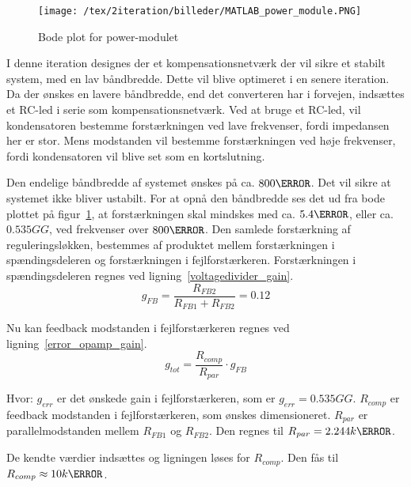 \begin{figure}[H]
	\center
	\texttt{[image: /tex/2iteration/billeder/MATLAB\_power\_module.PNG]}
	\caption{Bode plot for power-modulet}
	\label{fig:MATLAB_power_module}
\end{figure}

I denne iteration designes der et kompensationsnetværk der vil sikre et stabilt system, med en lav båndbredde. Dette vil blive optimeret i en senere iteration. 
Da der ønskes en lavere båndbredde, end det converteren har i forvejen, indsættes et RC-led i serie som kompensationsnetværk. Ved at bruge et RC-led, vil kondensatoren bestemme forstærkningen ved lave frekvenser, fordi impedansen her er stor. Mens modstanden vil bestemme forstærkningen ved høje frekvenser, fordi kondensatoren vil blive set som en kortslutning. 

Den endelige båndbredde af systemet ønskes på ca. $800\hertz$. Det vil sikre at systemet ikke bliver ustabilt. For at opnå den båndbredde ses det ud fra bode plottet på figur~\ref{fig:MATLAB_power_module}, at forstærkningen skal mindskes med ca. $5.4\decibel$, eller ca. $0.535GG$, ved frekvenser over $800\hertz$. Den samlede forstærkning af reguleringsløkken, bestemmes af produktet mellem forstærkningen i spændingsdeleren og forstærkningen i fejlforstærkeren. Forstærkningen i spændingsdeleren regnes ved ligning~\ref{voltagedivider_gain}.
\begin{equation} \label{voltagedivider_gain}
g_{FB} = \frac{R_{FB2}}{R_{FB1}+R_{FB2}} = 0.12
\end{equation}

\noindent Nu kan feedback modstanden i fejlforstærkeren regnes ved ligning~\ref{error_opamp_gain}. 
\begin{equation} \label{error_opamp_gain}
g_{tot} = \frac{R_{comp}}{R_{par}} \cdot g_{FB}
\end{equation}

\noindent Hvor:
\newline \noindent $g_{err}$ er det ønskede gain i fejlforstærkeren, som er $g_{err}=0.535GG$.
\newline \noindent $R_{comp}$ er feedback modstanden i fejlforstærkeren, som ønskes dimensioneret.
\newline \noindent $R_{par}$ er parallelmodstanden mellem $R_{FB1}$ og $R_{FB2}$. Den regnes til $R_{par}=2.244k\ohm$.

\noindent De kendte værdier indsættes og ligningen løses for $R_{comp}$. Den fås til $R_{comp}\approx 10k\ohm$.


